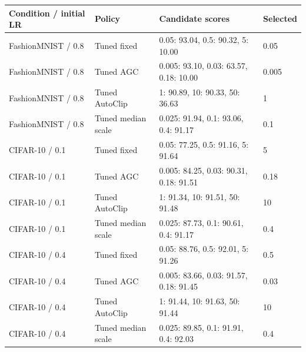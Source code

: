 \begin{tabular}{llll}
\toprule
Condition / initial LR & Policy & Candidate scores & Selected \\
\midrule
FashionMNIST / 0.8 & Tuned fixed & 0.05: 93.04, 0.5: 90.32, 5: 10.00 & 0.05 \\
FashionMNIST / 0.8 & Tuned AGC & 0.005: 93.10, 0.03: 63.57, 0.18: 10.00 & 0.005 \\
FashionMNIST / 0.8 & Tuned AutoClip & 1: 90.89, 10: 90.33, 50: 36.63 & 1 \\
FashionMNIST / 0.8 & Tuned median scale & 0.025: 91.94, 0.1: 93.06, 0.4: 91.17 & 0.1 \\
CIFAR-10 / 0.1 & Tuned fixed & 0.05: 77.25, 0.5: 91.16, 5: 91.64 & 5 \\
CIFAR-10 / 0.1 & Tuned AGC & 0.005: 84.25, 0.03: 90.31, 0.18: 91.51 & 0.18 \\
CIFAR-10 / 0.1 & Tuned AutoClip & 1: 91.34, 10: 91.51, 50: 91.48 & 10 \\
CIFAR-10 / 0.1 & Tuned median scale & 0.025: 87.73, 0.1: 90.61, 0.4: 91.17 & 0.4 \\
CIFAR-10 / 0.4 & Tuned fixed & 0.05: 88.76, 0.5: 92.01, 5: 91.26 & 0.5 \\
CIFAR-10 / 0.4 & Tuned AGC & 0.005: 83.66, 0.03: 91.57, 0.18: 91.45 & 0.03 \\
CIFAR-10 / 0.4 & Tuned AutoClip & 1: 91.44, 10: 91.63, 50: 91.44 & 10 \\
CIFAR-10 / 0.4 & Tuned median scale & 0.025: 89.85, 0.1: 91.91, 0.4: 92.03 & 0.4 \\
\bottomrule
\end{tabular}
